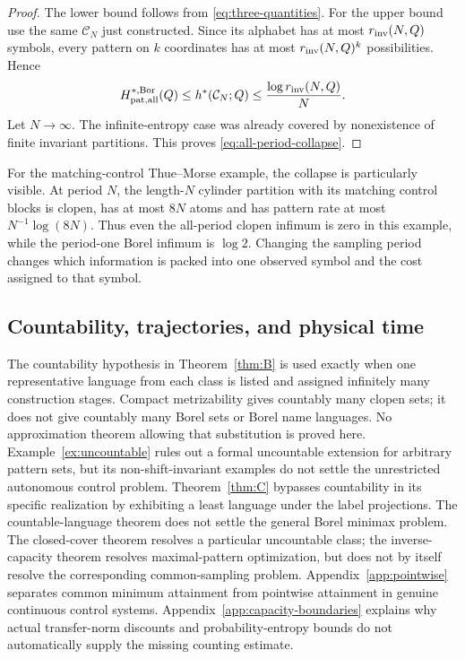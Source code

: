 \documentclass[11pt,reqno]{amsart}
\numberwithin{equation}{section}
\theoremstyle{definition}
\newcommand{\C}{\mathcal C}
\newcommand{\hpat}{h^{*}}
\newcommand{\Bor}{\mathrm{Bor}}
\begin{document}
\begin{proof}
The lower bound follows from
\eqref{eq:three-quantities}. For the upper bound use the same
$\C_N$ just constructed. Since its alphabet has at most
$r_{\rm inv}(N,Q)$ symbols, every pattern on $k$ coordinates has at most
$r_{\rm inv}(N,Q)^k$ possibilities. Hence
\begin{align*}
 H_{\rm pat,all}^{*,\Bor}(Q)
 \le\hpat(\C_N;Q)
 \le\frac{\log r_{\rm inv}(N,Q)}{N}.
\end{align*}
Let $N\to\infty$. The infinite-entropy case was already covered by
nonexistence of finite invariant partitions. This proves
\eqref{eq:all-period-collapse}.
\end{proof}

For the matching-control Thue--Morse example, the collapse is particularly
visible. At period $N$, the length-$N$ cylinder partition with its matching
control blocks is clopen, has at most $8N$ atoms and has pattern rate at
most $N^{-1}\log(8N)$. Thus even the all-period clopen infimum is zero
in this example, while the period-one Borel infimum is $\log2$.
Changing the sampling period changes which information is packed into
one observed symbol and the cost assigned to that symbol.

\subsection{Countability, trajectories, and physical time}
The countability hypothesis in Theorem~\ref{thm:B} is used exactly when
one representative language from each class is listed and assigned
infinitely many construction stages. Compact metrizability gives
countably many clopen sets; it does not give countably many Borel sets
or Borel name languages. No approximation theorem allowing that
substitution is proved here. Example~\ref{ex:uncountable} rules out a
formal uncountable extension for arbitrary pattern sets, but its
non-shift-invariant examples do not settle the unrestricted autonomous
control problem. Theorem~\ref{thm:C} bypasses countability in its specific
realization by exhibiting a least language under the label projections.
The countable-language theorem does not settle the general Borel minimax
problem. The closed-cover theorem resolves a particular uncountable
class; the inverse-capacity theorem resolves maximal-pattern optimization,
but does not by itself resolve the corresponding common-sampling problem. Appendix~\ref{app:pointwise} separates common minimum attainment from pointwise attainment in genuine continuous control systems. Appendix~\ref{app:capacity-boundaries} explains why actual transfer-norm discounts and probability-entropy bounds do not automatically supply the missing counting estimate.
\end{document}
